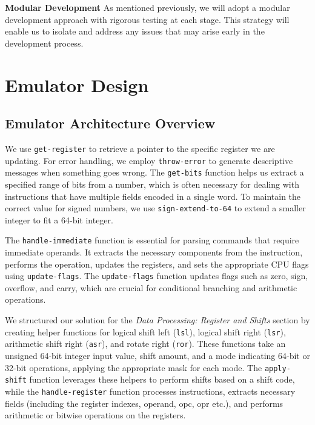 \documentclass[9pt,a4paper,twoside]{tau-class/tau}
\begin{document}
        \textbf{Modular Development}
        As mentioned previously, we will adopt a modular development approach with rigorous testing at each stage. This strategy will enable us to isolate and address any issues that may arise early in the development process.
        
\section{Emulator Design}   

    \subsection{Emulator Architecture Overview}
        We use \texttt{get-register} to retrieve a pointer to the specific register we are updating. For error handling, we employ \texttt{throw-error} to generate descriptive messages when something goes wrong. The \texttt{get-bits} function helps us extract a specified range of bits from a number, which is often necessary for dealing with instructions that have multiple fields encoded in a single word. To maintain the correct value for signed numbers, we use \texttt{sign-extend-to-64} to extend a smaller integer to fit a 64-bit integer.

        The \texttt{handle-immediate} function is essential for parsing commands that require immediate operands. It extracts the necessary components from the instruction, performs the operation, updates the registers, and sets the appropriate CPU flags using \texttt{update-flags}. The \texttt{update-flags} function updates flags such as zero, sign, overflow, and carry, which are crucial for conditional branching and arithmetic operations.
        
        We structured our solution for the \textit{Data Processing: Register and Shifts} section by creating helper functions for logical shift left (\texttt{lsl}), logical shift right (\texttt{lsr}), arithmetic shift right (\texttt{asr}), and rotate right (\texttt{ror}). These functions take an unsigned 64-bit integer input value, shift amount, and a mode indicating 64-bit or 32-bit operations, applying the appropriate mask for each mode. The \texttt{apply-shift} function leverages these helpers to perform shifts based on a shift code, while the \texttt{handle-register} function processes instructions, extracts necessary fields (including the register indexes, operand, opc, opr etc.), and performs arithmetic or bitwise operations on the registers. 
        
\end{document}
